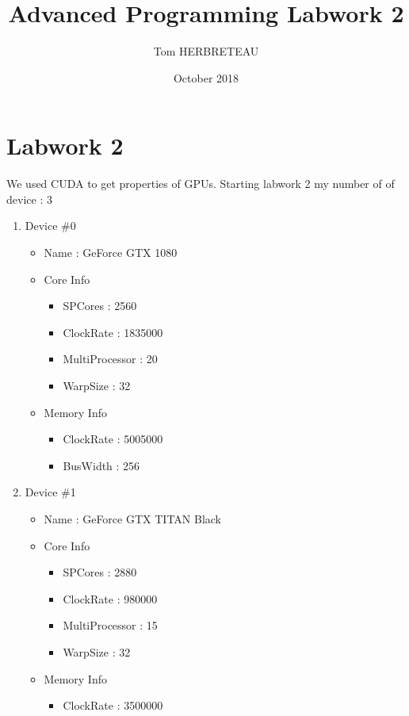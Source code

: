 \documentclass{article}
\title{Advanced Programming Labwork 2}
\author{Tom HERBRETEAU }
\date{October 2018}
\begin{document}
\maketitle

\section{Labwork 2}
We used CUDA to get properties of GPUs.
\newline Starting labwork 2
\newline my number of of device :  3
\begin{enumerate}
    \item Device \#0
    \begin{itemize}
        \item Name : GeForce GTX 1080
        \item Core Info
        \begin{itemize}
            \item SPCores : 2560
            \item ClockRate : 1835000
            \item MultiProcessor : 20
            \item WarpSize : 32
        \end{itemize}
        \item Memory Info
        \begin{itemize}
            \item ClockRate : 5005000
            \item BusWidth : 256
        \end{itemize}
    \end{itemize}
    \item Device \#1
    \begin{itemize}
        \item Name : GeForce GTX TITAN Black
        \item Core Info
        \begin{itemize}
            \item SPCores : 2880
            \item ClockRate : 980000
            \item MultiProcessor : 15
            \item WarpSize : 32
        \end{itemize}
        \item Memory Info
        \begin{itemize}
            \item ClockRate : 3500000

\end{itemize}
\end{itemize}
\end{enumerate}
\end{document}
